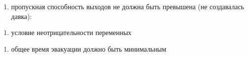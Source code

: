 \begin{enumerate}
\def\labelenumi{\arabic{enumi})}
\setcounter{enumi}{1}
\item
  пропускная способность выходов не должна быть превышена (не
  создавалась давка):
\end{enumerate}


\begin{enumerate}
\def\labelenumi{\arabic{enumi})}
\setcounter{enumi}{2}
\item
  условие неотрицательности переменных
\end{enumerate}


\begin{enumerate}
\def\labelenumi{\arabic{enumi})}
\setcounter{enumi}{3}
\item
  общее время эвакуации должно быть минимальным
\end{enumerate}

